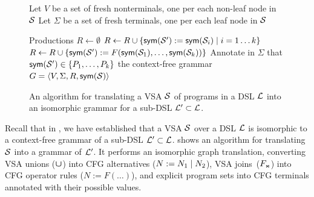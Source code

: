 \begin{figure}[t]
    \centering
    \small
    \begin{algorithmic}[1]
            \State Let $V$ be a set of fresh nonterminals, one per each non-leaf node in $\mathcal{S}$
            \State Let $\Sigma$ be a set of fresh terminals, one per each leaf node in $\mathcal{S}$
            \State {}
            \addtocounter{ALG@line}{-1}
            \WithNumber \State Productions $R \gets \emptyset$
            \State {}
                \State $R \gets R \cup \{ \mathsf{sym}(\mathcal{S}') := \mathsf{sym}(\mathcal{S}_i) \mid i = 1 \dots k \}$
            \EndFor
            \State {}
                \State $R \gets R \cup \{ \mathsf{sym}(\mathcal{S}') := F(\mathsf{sym}(\mathcal{S}_1), \dots, \mathsf{sym}(\mathcal{S}_k)) \}$
            \EndFor
            \State {}
                \State Annotate in $\Sigma$ that $\mathsf{sym}(\mathcal{S}') \in \{ P_1, \dots, P_k \}$
            \EndFor
            \State \Return the context-free grammar $G = \langle V, \Sigma, R, \mathsf{sym}(\mathcal{S})\rangle$
        \EndFunction
    \end{algorithmic}
    \uwsinglespace
    \vspace*{\baselineskip}
    \caption{An algorithm for translating a VSA $\mathcal{S}$ of programs in a DSL $\mathcal{L}$ into an isomorphic grammar for a
        sub-DSL $\mathcal{L}' \subset \mathcal{L}$.}
    \label{fig:vsa:incremental}
\end{figure}

Recall that in , we have established that a VSA $\mathcal{S}$ over a DSL $\mathcal{L}$ is isomorphic to a
context-free grammar of a sub-DSL $\mathcal{L}' \subset \mathcal{L}$.
 shows an algorithm for translating $\mathcal{S}$ into a grammar of $\mathcal{L}'$.
It performs an isomorphic graph translation, converting VSA unions ($\bm{\mathsf{\cup}}$) into CFG alternatives ($N := N_1 \;|\;
N_2$), VSA joins~($F_{\text{\tiny\ensuremath{\Join}}}$) into CFG operator rules ($N := F(\dots)$), and explicit program sets into CFG terminals
annotated with their possible values.

